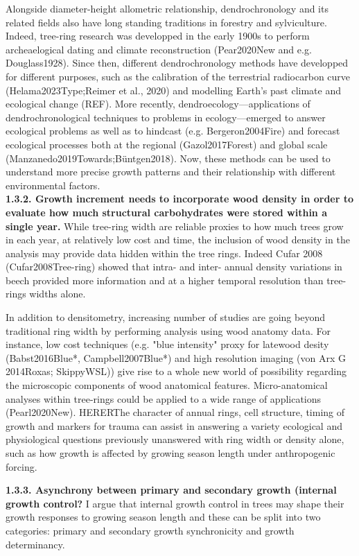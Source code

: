 \documentclass{article}
\begin{document}
Alongside diameter-height allometric relationship, dendrochronology and its related fields also have long standing traditions in forestry and sylviculture. Indeed, tree-ring research was developped in the early 1900s to perform archeaelogical dating and climate reconstruction (Pear2020New and e.g. Douglass1928). Since then, different dendrochronology methods have developped for different purposes, such as the calibration of the terrestrial radiocarbon curve (Helama2023Type;Reimer et al., 2020) and modelling Earth's past climate and ecological change (REF). More recently, dendroecology---applications of dendrochronological techniques to problems in ecology---emerged to answer ecological problems as well as to hindcast (e.g. Bergeron2004Fire) and forecast ecological processes both at the regional (Gazol2017Forest) and global scale (Manzanedo2019Towards;Büntgen2018). Now, these methods can be used to understand more precise growth patterns and their relationship with different environmental factors.\\

\textbf{1.3.2. Growth increment needs to incorporate wood density in order to evaluate how much structural carbohydrates were stored within a single year.}
While tree-ring width are reliable proxies to how much trees grow in each year, at relatively low cost and time, the inclusion of wood density in the analysis may provide data hidden within the tree rings. Indeed Cufar 2008 (Cufar2008Tree-ring) showed that intra- and inter- annual density variations in beech provided more information and at a higher temporal resolution than tree-rings widths alone. 

In addition to densitometry, increasing number of studies are going beyond traditional ring width by performing analysis using wood anatomy data. For instance, low cost techniques (e.g. "blue intensity" proxy for latewood desity (Babst2016Blue*, Campbell2007Blue*) and high resolution imaging (von Arx G 2014Roxas; SkippyWSL)) give rise to a whole new world of possibility regarding the microscopic components of wood anatomical features. Micro-anatomical analyses within tree-rings could be applied to a wide range of applications (Pearl2020New). HERERThe character of annual rings, cell structure, timing of growth and markers for trauma can assist in answering a variety ecological and physiological questions previously unanswered with ring width or density alone, such as how growth is affected by growing season length under anthropogenic forcing.

\textbf{1.3.3. Asynchrony between primary and secondary growth (internal growth control?}
I argue that internal growth control in trees may shape their growth responses to growing season length and these can be split into two categories: primary and secondary growth synchronicity and growth determinancy. 
\end{document}
